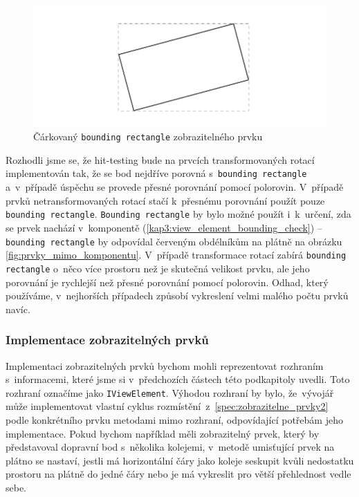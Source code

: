 \begin{figure}[!bht]
	\centering
	\includegraphics[width=\textwidth]{../img/kap3_rectangle_bounding}
	\caption{Čárkovaný \texttt{bounding rectangle} zobrazitelného prvku}
	\label{fig:bounding-rectangle}
\end{figure}

Rozhodli jsme se, že hit-testing bude na prvcích transformovaných rotací implementován tak, že se bod nejdříve porovná s~\texttt{bounding rectangle} a~v~případě úspěchu se provede přesné porovnání pomocí polorovin. V~případě prvků netransformovaných rotací stačí k~přesnému porovnání  použít pouze \texttt{bounding rectangle}. \texttt{Bounding rectangle} by bylo možné použít i~k~určení, zda se prvek nachází v~komponentě (\ref{kap3:view_element_bounding_check}) -- \texttt{bounding rectangle} by odpovídal červeným obdélníkům na plátně na obrázku \ref{fig:prvky_mimo_komponentu}. V~případě transformace rotací zabírá \texttt{bounding rectangle} o~něco více prostoru než je skutečná velikost prvku, ale jeho porovnání je rychlejší než přesné porovnání pomocí polorovin. Odhad, který používáme, v~nejhorších případech způsobí vykreslení velmi malého počtu prvků navíc.

\subsubsection*{Implementace zobrazitelných prvků}
\label{kap3:layout_cycle_view_element}
Implementaci zobrazitelných prvků bychom mohli reprezentovat rozhraním s~informacemi, které jsme si v~předchozích částech této podkapitoly uvedli. Toto rozhraní označíme jako \texttt{IViewElement}. Výhodou rozhraní by bylo, že~vývojář může implementovat vlastní cyklus rozmístění~z~\ref{spec:zobrazitelne_prvky2} podle konkrétního prvku metodami mimo rozhraní, odpovídající potřebám jeho implementace. Pokud \linebreak bychom například měli zobrazitelný prvek, který by představoval dopravní bod s~několika kolejemi, v~metodě umisťující prvek na plátno se nastaví, jestli má horizontální čáry jako koleje seskupit kvůli nedostatku prostoru na plátně do jedné čáry nebo je má vykreslit pro větší přehlednost vedle sebe.

